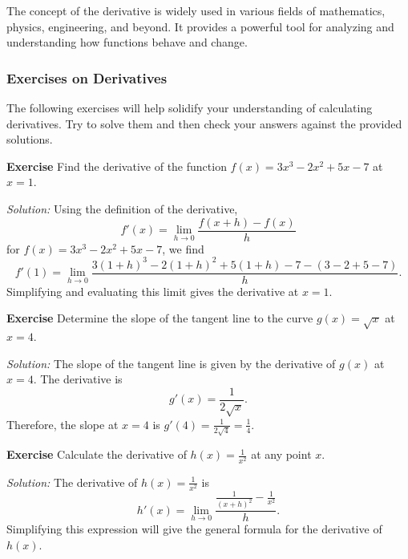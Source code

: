 \documentclass[a4paper,12pt]{book}
\newenvironment{exercise}[1][]
  {\par\medskip\noindent\textbf{Exercise #1} \rmfamily}
  {\medskip}
\newenvironment{solution}[1][]
{\par\noindent\textit{Solution:} \rmfamily}{\medskip}
\begin{document}
The concept of the derivative is widely used in various fields of mathematics, physics, engineering, and beyond. It provides a powerful tool for analyzing and understanding how functions behave and change.

\subsubsection*{Exercises on Derivatives}

The following exercises will help solidify your understanding of calculating derivatives. Try to solve them and then check your answers against the provided solutions.

\begin{exercise}
Find the derivative of the function \( f(x) = 3x^3 - 2x^2 + 5x - 7 \) at \( x = 1 \).
\end{exercise}

\begin{solution}
Using the definition of the derivative,
\[ f'(x) = \lim_{h \to 0} \frac{f(x+h) - f(x)}{h} \]
for \( f(x) = 3x^3 - 2x^2 + 5x - 7 \), we find
\[ f'(1) = \lim_{h \to 0} \frac{3(1+h)^3 - 2(1+h)^2 + 5(1+h) - 7 - (3 - 2 + 5 - 7)}{h}. \]
Simplifying and evaluating this limit gives the derivative at \( x = 1 \).
\end{solution}

\begin{exercise}
Determine the slope of the tangent line to the curve \( g(x) = \sqrt{x} \) at \( x = 4 \).
\end{exercise}

\begin{solution}
The slope of the tangent line is given by the derivative of \( g(x) \) at \( x = 4 \). The derivative is
\[ g'(x) = \frac{1}{2\sqrt{x}}. \]
Therefore, the slope at \( x = 4 \) is \( g'(4) = \frac{1}{2\sqrt{4}} = \frac{1}{4}. \)
\end{solution}

\begin{exercise}
Calculate the derivative of \( h(x) = \frac{1}{x^2} \) at any point \( x \).
\end{exercise}

\begin{solution}
The derivative of \( h(x) = \frac{1}{x^2} \) is
\[ h'(x) = \lim_{h \to 0} \frac{\frac{1}{(x+h)^2} - \frac{1}{x^2}}{h}. \]
Simplifying this expression will give the general formula for the derivative of \( h(x) \).
\end{solution}
\end{document}
